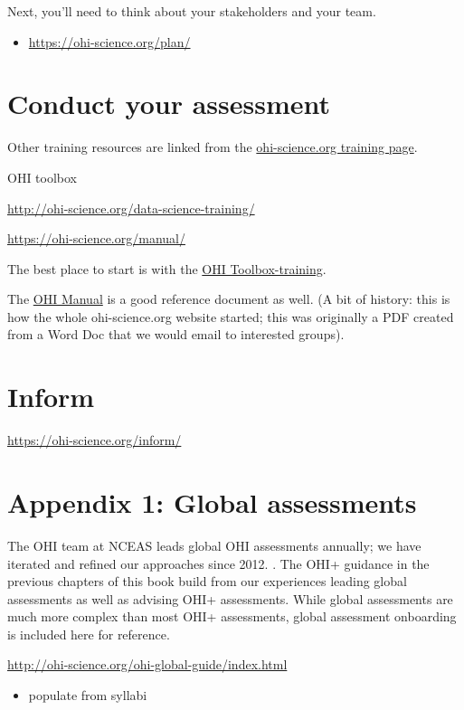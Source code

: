 \documentclass[
]{book}
\providecommand{\tightlist}{%
  \setlength{\itemsep}{0pt}\setlength{\parskip}{0pt}}
\begin{document}
Next, you'll need to think about your stakeholders and your team.

\begin{itemize}
\tightlist
\item
  \url{https://ohi-science.org/plan/}
\end{itemize}

\hypertarget{conduct}{%
\chapter{Conduct your assessment}\label{conduct}}

Other training resources are linked from the \href{https://ohi-science.org/training/}{ohi-science.org training page}.

OHI toolbox

\url{http://ohi-science.org/data-science-training/}

\url{https://ohi-science.org/manual/}

The best place to start is with the \href{http://ohi-science.org/toolbox-training/}{OHI Toolbox-training}.

The \href{https://ohi-science.org/manual/}{OHI Manual} is a good reference document as well. (A bit of history: this is how the whole ohi-science.org website started; this was originally a PDF created from a Word Doc that we would email to interested groups).

\hypertarget{inform}{%
\chapter{Inform}\label{inform}}

\url{https://ohi-science.org/inform/}

\hypertarget{global}{%
\chapter{Appendix 1: Global assessments}\label{global}}

The OHI team at NCEAS leads global OHI assessments annually; we have iterated and refined our approaches since 2012. . The OHI+ guidance in the previous chapters of this book build from our experiences leading global assessments as well as advising OHI+ assessments. While global assessments are much more complex than most OHI+ assessments, global assessment onboarding is included here for reference.

\url{http://ohi-science.org/ohi-global-guide/index.html}

\begin{itemize}
\tightlist
\item
  populate from syllabi
\end{itemize}

  
\end{document}
